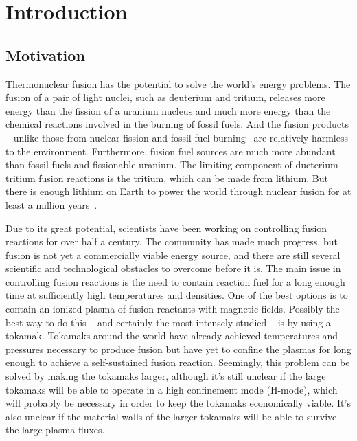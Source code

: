 \chapter{Introduction}
\label{c_intro}

\section{Motivation}
\label{s_motivation}

Thermonuclear fusion has the potential to solve the world's energy problems. The fusion of a pair of light nuclei, such as deuterium and tritium, releases more energy than the fission
of a uranium nucleus and much more energy than the chemical reactions involved in the burning of fossil fuels. And the fusion products 
-- unlike those from nuclear fission and fossil fuel burning-- are relatively harmless to the environment. Furthermore, fusion fuel sources are much more abundant than fossil fuels
and fissionable uranium. The limiting component of dueterium-tritium fusion reactions is the tritium, which can be made from lithium. But there is enough lithium on Earth to power the world
through nuclear fusion for at least a million years~\cite{wesson2004}.

Due to its great potential, scientists have been working on controlling fusion reactions for over half a century. The community has made much progress, but fusion is not yet a commercially
viable energy source, and there are still several scientific and technological obstacles to overcome before it is. The main issue in controlling fusion reactions is the need to contain
reaction fuel for a long enough time at sufficiently high temperatures and densities. One of the best options is to contain an ionized plasma of fusion reactants with magnetic fields. 
Possibly the best way to do this -- and certainly the most intensely studied -- is by using a tokamak. Tokamaks around the world have already achieved temperatures and pressures
necessary to produce fusion but have yet to confine the plasmas for long enough to achieve a self-sustained fusion reaction. Seemingly, this problem can be solved by making
the tokamaks larger, although it's still unclear if the large tokamaks will be able to operate in a high confinement mode (H-mode), which will probably be necessary in order to
keep the tokamaks economically viable. It's also unclear if the material walls of the larger tokamaks will be able to survive the large plasma fluxes.

